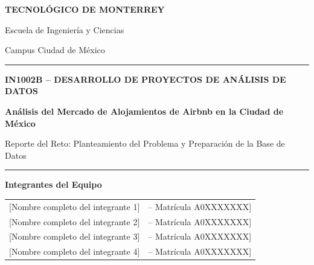 \documentclass[12pt,letterpaper,oneside]{report}
\newcommand{\Institucion}{Tecnológico de Monterrey}
\newcommand{\Escuela}{Escuela de Ingeniería y Ciencias}
\newcommand{\Campus}{Campus Ciudad de México} %
\newcommand{\Materia}{IN1002B -- Desarrollo de Proyectos de Análisis de Datos}
\newcommand{\TituloReporte}{Análisis del Mercado de Alojamientos de Airbnb en la Ciudad de México}
\newcommand{\SubtituloReporte}{Reporte del Reto: Planteamiento del Problema y Preparación de la Base de Datos}
\begin{document}
\begin{titlepage}
  \singlespacing
  \setlength{\parskip}{0pt}
  \centering
  \vspace*{0.1cm}

  {\Large\bfseries\color{NavyPrimary}\MakeUppercase{\Institucion}\par}
  \vspace{0.15cm}
  {\large\color{BlueAccent}\Escuela\par}
  \vspace{0.08cm}
  {\normalsize\color{gray}\Campus\par}

  \vspace{0.4cm}
  {\color{NavyPrimary}\rule{\textwidth}{1.5pt}}
  \vspace{0.65cm}

  {\large\bfseries\color{BlueAccent}\MakeUppercase{\Materia}\par}
  \vspace{0.5cm}

  {\Huge\bfseries\color{NavyPrimary}\TituloReporte\par}
  \vspace{0.35cm}
  {\large\color{black!75}\SubtituloReporte\par}

  \vspace{0.55cm}
  {\color{NavyPrimary}\rule{0.65\textwidth}{0.8pt}}
  \vspace{0.65cm}

  \begin{tcolorbox}[
    colback=LightBg,
    colframe=NavyPrimary,
    arc=3pt,
    boxrule=0.8pt,
    width=0.90\textwidth,
    left=12pt, right=12pt, top=8pt, bottom=8pt,
    before skip=0pt, after skip=0pt
  ]
    \centering
    \textbf{\color{NavyPrimary}Integrantes del Equipo}\\[6pt]
    \small
    \begin{tabular}{ll}
      {[}Nombre completo del integrante 1{]} & -- \quad {[}Matrícula A0XXXXXXX{]} \\[2pt]
      {[}Nombre completo del integrante 2{]} & -- \quad {[}Matrícula A0XXXXXXX{]} \\[2pt]
      {[}Nombre completo del integrante 3{]} & -- \quad {[}Matrícula A0XXXXXXX{]} \\[2pt]
      {[}Nombre completo del integrante 4{]} & -- \quad {[}Matrícula A0XXXXXXX{]} \\
    \end{tabular}
  \end{tcolorbox}


\end{titlepage}
\end{document}
